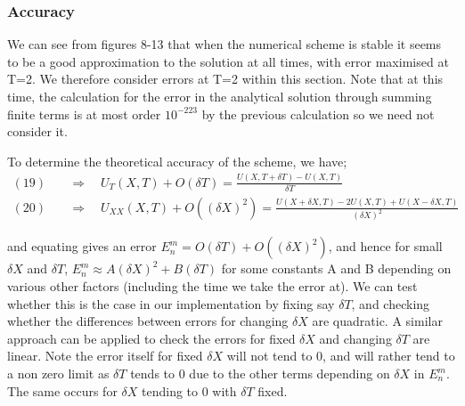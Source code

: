 \documentclass[10pt,a4paper]{report}
\begin{document}
\subsubsection{Accuracy}

We can see from figures 8-13 that when the numerical scheme is stable it seems to be a good approximation to the solution at all times, with error maximised at T=2. We therefore consider errors at T=2 within this section. Note that at this time, the calculation for the error in the analytical solution through summing finite terms is at most order $10^{-223}$ by the previous calculation so we need not consider it.\par
\vspace{0.5cm}
To determine the theoretical accuracy of the scheme, we have;
\begin{align*}
(19) \quad &\Rightarrow \quad U_T(X,T)+O(\delta T)=\frac{U(X,T+\delta T)-U(X,T)}{\delta T}\\
(20) \quad &\Rightarrow \quad U_{XX}(X,T)+O((\delta X)^2)=\frac{U(X+\delta X,T)-2U(X,T)+U(X-\delta X,T)}{(\delta X)^2}
\end{align*}

and equating gives an error $E_n^m=O(\delta T)+O((\delta X)^2)$, and hence for small $\delta X$ and $\delta T$, $E_n^m \approx A(\delta X)^2 + B(\delta T)$ for some constants A and B depending on various other factors (including the time we take the error at). We can test whether this is the case in our implementation by fixing say $\delta T$, and checking whether the differences between errors for changing $\delta X$ are quadratic. A similar approach can be applied to check the errors for fixed $\delta X$ and changing $\delta T$ are linear. Note the error itself for fixed $\delta X$ will not tend to 0, and will rather tend to a non zero limit as $\delta T$ tends to 0 due to the other terms depending on $\delta X$ in $E_n^m$. The same occurs for $\delta X$ tending to 0 with $\delta T$ fixed. 
\end{document}
